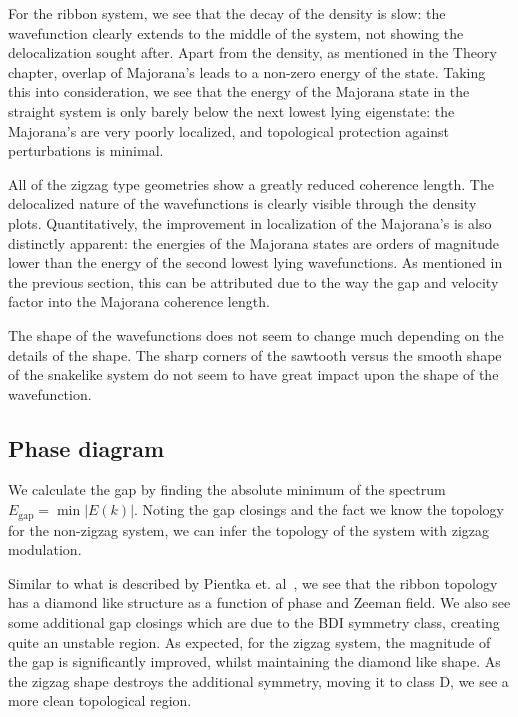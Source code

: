 			For the ribbon system, we see that the decay of the density is slow: the wavefunction clearly extends to the middle of the system, not showing the delocalization sought after.
			Apart from the density, as mentioned in the Theory chapter, overlap of Majorana's leads to a non-zero energy of the state.
			Taking this into consideration, we see that the energy of the Majorana state in the straight system is only barely below the next lowest lying eigenstate: the Majorana's are very poorly localized, and topological protection against perturbations is minimal.
			
			All of the zigzag type geometries show a greatly reduced coherence length.
			The delocalized nature of the wavefunctions is clearly visible through the density plots.
			Quantitatively, the improvement in localization of the Majorana's is also distinctly apparent: the energies of the Majorana states are orders of magnitude lower than the energy of the second lowest lying wavefunctions.
			As mentioned in the previous section, this can be attributed due to the way the gap and velocity factor into the Majorana coherence length.

			The shape of the wavefunctions does not seem to change much depending on the details of the shape.
			The sharp corners of the sawtooth versus the smooth shape of the snakelike system do not seem to have great impact upon the shape of the wavefunction.


		\subsection{Phase diagram}
			We calculate the gap by finding the absolute minimum of the spectrum $E_\textrm{gap}=\min{|E(k)|}$.
			Noting the gap closings and the fact we know the topology for the non-zigzag system, we can infer the topology of the system with zigzag modulation. %

			Similar to what is described by Pientka et. al~\cite{pientka2017topological}, we see that the ribbon topology has a diamond like structure as a function of phase and Zeeman field.
			We also see some additional gap closings which are due to the BDI symmetry class, creating quite an unstable region.
			As expected, for the zigzag system, the magnitude of the gap is significantly improved, whilst maintaining the diamond like shape.
			As the zigzag shape destroys the additional symmetry, moving it to class D, we see a more clean topological region.


